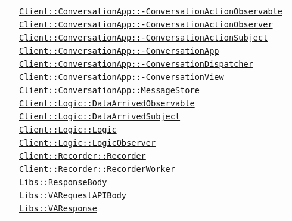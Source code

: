 \begin{longtable}{|>{\centering}m{3cm}|m{10cm}<{\centering}|}
& \hyperref[Client::ConversationApp::ConversationActionObservable]{\texttt{Client::ConversationApp::-\linebreak ConversationActionObservable}}\\
& \hyperref[Client::ConversationApp::ConversationActionObserver]{\texttt{Client::ConversationApp::-\linebreak ConversationActionObserver}}\\
& \hyperref[Client::ConversationApp::ConversationActionSubject]{\texttt{Client::ConversationApp::-\linebreak ConversationActionSubject}}\\
& \hyperref[Client::ConversationApp::ConversationApp]{\texttt{Client::ConversationApp::-\linebreak ConversationApp}}\\
& \hyperref[Client::ConversationApp::ConversationDispatcher]{\texttt{Client::ConversationApp::-\linebreak ConversationDispatcher}}\\
& \hyperref[Client::ConversationApp::ConversationView]{\texttt{Client::ConversationApp::-\linebreak ConversationView}}\\
& \hyperref[Client::ConversationApp::MessageStore]{\texttt{Client::ConversationApp::MessageStore}}\\
& \hyperref[Client::Logic::DataArrivedObservable]{\texttt{Client::Logic::DataArrivedObservable}}\\
& \hyperref[Client::Logic::DataArrivedSubject]{\texttt{Client::Logic::DataArrivedSubject}}\\
& \hyperref[Client::Logic::Logic]{\texttt{Client::Logic::Logic}}\\
& \hyperref[Client::Logic::LogicObserver]{\texttt{Client::Logic::LogicObserver}}\\
& \hyperref[Client::Recorder::Recorder]{\texttt{Client::Recorder::Recorder}}\\
& \hyperref[Client::Recorder::RecorderWorker]{\texttt{Client::Recorder::RecorderWorker}}\\
& \hyperref[Libs::ResponseBody]{\texttt{Libs::ResponseBody}}\\
& \hyperref[Libs::VARequestAPIBody]{\texttt{Libs::VARequestAPIBody}}\\
& \hyperref[Libs::VAResponse]{\texttt{Libs::VAResponse}}\\ \hline


\end{longtable}
